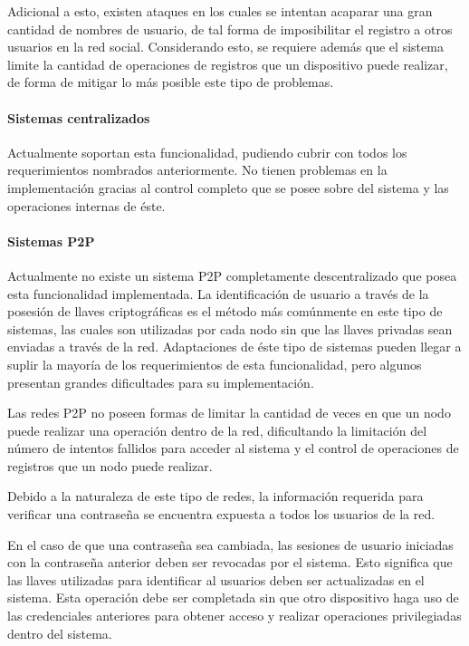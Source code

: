     Adicional a esto, existen ataques en los cuales se intentan acaparar una
    gran cantidad de nombres de usuario, de tal forma de imposibilitar el registro
    a otros usuarios en la red social. Considerando esto, se requiere además
    que el sistema limite la cantidad de operaciones de registros que un
    dispositivo puede realizar, de forma de mitigar lo más posible este tipo de
    problemas.


    \paragraph{Sistemas centralizados}
      Actualmente soportan esta funcionalidad, pudiendo cubrir con todos los
      requerimientos nombrados anteriormente. No tienen problemas en la
      implementación gracias al control completo que se posee sobre del sistema y las
      operaciones internas de éste.

    \paragraph{Sistemas P2P}
      Actualmente no existe un sistema P2P completamente descentralizado que posea esta funcionalidad
      implementada. La identificación de usuario a través de la posesión de llaves criptográficas es
      el método más comúnmente en este tipo de sistemas, las cuales son
      utilizadas por cada nodo sin que las llaves privadas sean enviadas a través de
      la red. Adaptaciones de éste tipo de sistemas pueden llegar a suplir la
      mayoría de los requerimientos de esta funcionalidad, pero algunos presentan
      grandes dificultades para su implementación.

      Las redes P2P no poseen formas de limitar la cantidad de veces en que un nodo
      puede realizar una operación dentro de la red, dificultando la limitación
      del número de intentos fallidos para acceder al sistema y el control de
      operaciones de registros que un nodo puede realizar.

      Debido a la naturaleza de este tipo de redes, la información requerida
      para verificar una contraseña se encuentra expuesta a todos los usuarios de la
      red.

      En el caso de que una contraseña sea cambiada, las sesiones de usuario
      iniciadas con la contraseña anterior deben ser revocadas por el sistema.
      Esto significa que las llaves utilizadas para identificar al usuarios deben ser
      actualizadas en el sistema. Esta operación debe ser completada sin que
      otro dispositivo haga uso de las credenciales anteriores para obtener acceso y
      realizar operaciones privilegiadas dentro del sistema.

